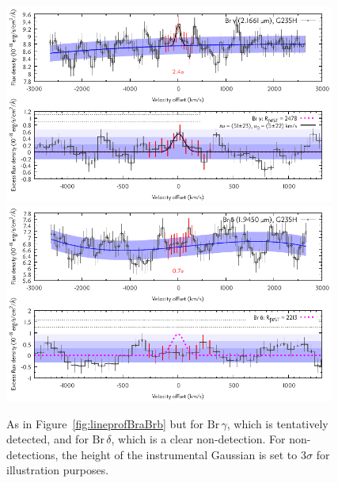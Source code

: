 \documentclass[twocolumn,twocolumnappendix]{aastex631}
\def\Brg{\ensuremath{\mathrm{Br}\,\gamma}\xspace}           %
\def\Brd{\ensuremath{\mathrm{Br}\,\delta}\xspace}           %
\begin{document}
\begin{figure}
 \centering
 \includegraphics[width=0.97\textwidth]{TWA27b_g235h-f170lp_blauw_sigkorr_Brg_Dv2700_ohni300_Abb_simul.pdf}
 \includegraphics[width=0.97\textwidth]{TWA27b_g235h-f170lp_blauw_sigkorr_Brd_Dv2700_ohni300_Abb_simul.pdf}
\caption{%
As in Figure~\ref{fig:lineprofBraBrb} but for \Brg, which is tentatively detected, and for \Brd, which is a clear non-detection. For non-detections, the height of the instrumental Gaussian is set to $3\sigma$ for illustration purposes.
}
\label{fig:lineprofBrgBrd}
\end{figure}
\end{document}
